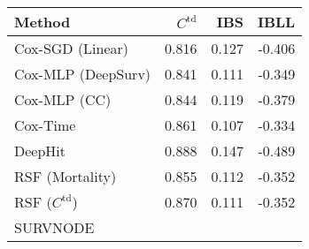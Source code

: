 \begin{tabular}{lrrr}
    \toprule
    Method &    $C^\text{td}$ &    IBS &  IBLL \\
    \midrule
    Cox-SGD (Linear)   &  0.816          &  0.127          & -0.406 \\
    Cox-MLP (DeepSurv) &  0.841          &  0.111          & -0.349 \\
    Cox-MLP (CC)       &  0.844          &  0.119          & -0.379 \\
    Cox-Time           &  0.861          &  0.107 & -0.334 \\
    DeepHit            &  0.888 &  0.147          & -0.489 \\
    RSF (Mortality)    &  0.855          &  0.112          & -0.352 \\
    RSF ($C^\text{td}$)          &  0.870          &  0.111          & -0.352 \\
    SURVNODE & & & \\
    \bottomrule
\end{tabular}